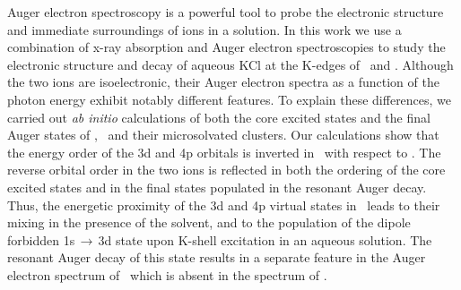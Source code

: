 Auger electron spectroscopy is a powerful tool to probe the electronic structure and immediate surroundings of ions in a solution. In this work we use a combination of x-ray absorption and Auger electron spectroscopies to study the electronic structure and decay of aqueous KCl at the K-edges of \ki~and \cli. Although the two ions are isoelectronic, their Auger electron spectra as a function of the photon energy exhibit notably different features. To explain these differences, we carried out {\it ab initio} calculations of both the core excited states and the final Auger states of \ki, \cli~and their microsolvated clusters. Our calculations show that the energy order of the 3d and 4p orbitals is inverted in \ki~with respect to \cli. 
%
%
The reverse orbital order in the two ions is reflected in both the ordering of the core excited states and in the final states populated in the resonant Auger decay. Thus, the energetic proximity of the 3d and 4p virtual states in \ki~leads to their mixing in the presence of the solvent, and to the population of the dipole forbidden 1s$\,\rightarrow\,$3d state upon K-shell excitation in an aqueous solution. The resonant Auger decay of this state results in a separate feature in the Auger electron spectrum of \ki~which is absent in the spectrum of \cli.
